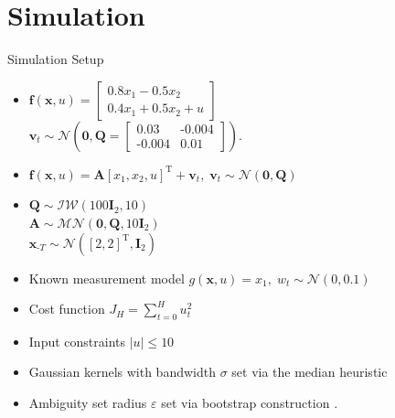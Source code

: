 \documentclass[student, noshadow, itr, english, aspectratio=169]{ITR_LSR_slides}
\begin{document}
\section{Simulation}

\begin{frame}{Simulation Setup}
\begin{itemize}
\item 
{}
$\boldsymbol{f}(\boldsymbol{x}, u) = 
\begin{bmatrix}
0.8  x_1 - 0.5 x_2 \\
0.4 x_1 + 0.5 x_2 + u
\end{bmatrix}$ \\
\makebox[4cm]{\hfill} $\boldsymbol{v}_t \sim \mathcal{N} \left(\boldsymbol{0}, \boldsymbol{Q} =  
\begin{bmatrix}
0.03 & \text{-}0.004 \\
\text{-}0.004 & 0.01
\end{bmatrix}
\right).$

\item 
{} $\boldsymbol{f}(\boldsymbol{x}, u) = \boldsymbol{A} \left[ x_1,  x_2,  u \right]^\text{T} + \boldsymbol{v}_{t}, \; \boldsymbol{v}_{t} \sim \mathcal{N} (\boldsymbol{0}, \boldsymbol{Q})$ 
\item
{} $\boldsymbol{Q} \sim \mathcal{IW} (100 \boldsymbol{I}_2, 10)$ \\
\makebox[4.5cm]{\hfill} $\boldsymbol{A} \sim \mathcal{MN} (\boldsymbol{0}, \boldsymbol{Q}, 10 \boldsymbol{I}_2)\;\;\;\;\;\;\;\;\;\;\;\;\;\;\;\;\;\;$ \cite{Svensson_17}\\
\makebox[4.5cm]{\hfill} $\boldsymbol{x}_{\text{-}T} \sim \mathcal{N} ([2, 2]^\text{T}, \boldsymbol{I}_2)$


\item Known measurement model $g(\boldsymbol{x}, u) = x_1, \; w_t \sim \mathcal{N} (0, 0.1)$

\item Cost function $J_H = \sum_{t = 0}^H u_t^2$

\item Input constraints $\left| u \right| \leq 10$

\item Gaussian kernels with bandwidth $\sigma$ set via the median heuristic \cite{Damien_18}

\item Ambiguity set radius $\varepsilon$ set via bootstrap construction \cite{Yassine_22}.
\end{itemize}
\end{frame}	
\end{document}
